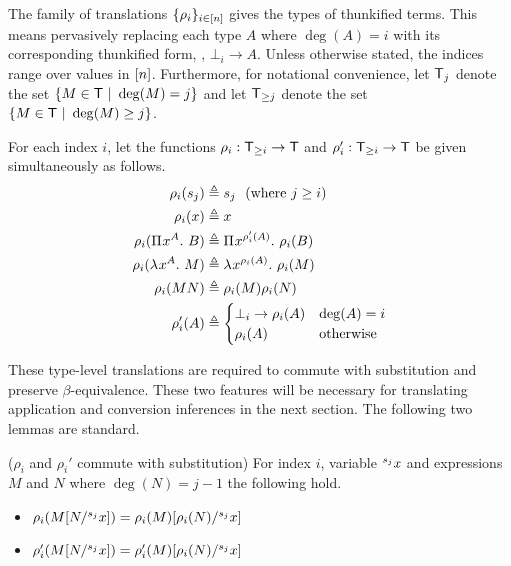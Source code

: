 \documentclass{article}
\begin{document}
The family of translations $\{\rho_i\}_{i \in [n]}$ gives the types of thunkified terms.
This means pervasively replacing each type $A$ where $\deg(A) = i$ with its corresponding thunkified form, \ie, $\bot_i \to A$.
Unless otherwise stated, the indices range over values in $[n]$.
Furthermore, for notational convenience, let $\mathsf{T}_j$ denote the set $\{M \in \mathsf{T} \ | \ \deg(M) = j\}$ and let $\mathsf{T}_{\geq j}$ denote the set $\{M \in \mathsf{T} \ | \ \deg(M) \geq j\}$.

\begin{definition}
For each index $i$, let the functions $\rho_i : \mathsf{T}_{\geq i} \to \mathsf{T}$ and $\rho_i' : \mathsf{T}_{\geq i} \to \mathsf{T}$ be given simultaneously as follows.
\begin{align*}
\rho_i(s_j) &\triangleq s_j \textnormal{\ \ (where $j \geq i$)} \\
\rho_i(x) &\triangleq x \\
\rho_i({\Pi^{} {x}^{A}. \ {B}}) &\triangleq {\Pi^{} {x}^{\rho_i'(A)}. \ {\rho_i(B)}} \\
\rho_i(\lambda^{} x^{A}. \ M) &\triangleq \lambda^{} x^{\rho_i(A)}. \ \rho_i(M) \\
\rho_i(MN) &\triangleq \rho_i(M)\rho_i(N) \\
\rho_i'(A) &\triangleq
\begin{cases}
    \bot_i \to \rho_i(A) & \deg(A) = i \\
    \rho_i(A) & \textnormal{otherwise}
\end{cases} 
\end{align*}
\end{definition}

These type-level translations are required to commute with substitution and preserve $\beta$-equivalence.
These two features will be necessary for translating application and conversion inferences in the next section.
The following two lemmas are standard.

\begin{lemma}
\label{lem:rho-commutes-sub}
($\rho_i$ and $\rho_i'$ commute with substitution) For index $i$, variable ${}^{s_{j}}{x}$ and expressions $M$ and $N$ where $\deg(N) = j - 1$ the following hold.
\begin{itemize}
\item $\rho_i(M[N/{}^{s_{j}}{x}]) = \rho_i(M)[\rho_i(N)/{}^{s_{j}}{x}]$
\item $\rho_i'(M[N/{}^{s_{j}}{x}]) = \rho_i'(M)[\rho_i(N)/{}^{s_{j}}{x}]$
\end{itemize}
\end{lemma}
\end{document}
